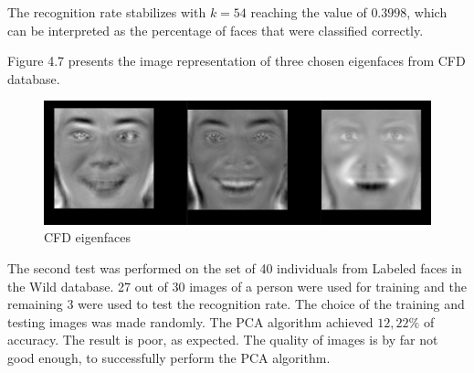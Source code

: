 The recognition rate stabilizes with $k = 54$ reaching the value of $0.3998$, which can be interpreted as the percentage of faces that were classified correctly. 

Figure 4.7 presents the image representation of three chosen eigenfaces from CFD database.

\begin{figure}[H]
\centering
\includegraphics[scale=0.3]{eigenfaces_CFD.jpg}
\caption{CFD eigenfaces}
\end{figure} 


The second test was performed on the set of 40 individuals from Labeled faces in the Wild database. 27 out of 30 images of a person were used for training and the remaining 3 were used to test the recognition rate. The choice of the training and testing images was made randomly.
The PCA algorithm achieved $12,22\%$ of accuracy. The result is poor, as expected. The quality of images is by far not good enough, to successfully perform the PCA algorithm.



